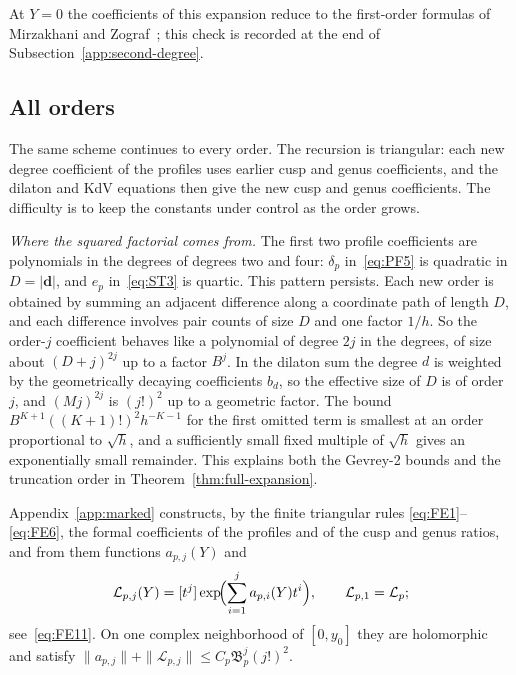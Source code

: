 At $Y=0$ the coefficients of this expansion reduce to the first-order
formulas of Mirzakhani and Zograf~\cite[Theorems~1.4 and~3.2(i)]{MZ};
this check is recorded at the end of Subsection~\ref{app:second-degree}.

\subsection{All orders}\label{subsec:all-orders}
The same scheme continues to every order. The recursion is triangular:
each new degree coefficient of the profiles uses earlier cusp and genus
coefficients, and the dilaton and KdV equations then give the new cusp and
genus coefficients. The difficulty is to keep the constants under control
as the order grows.

\emph{Where the squared factorial comes from.} The first two profile coefficients are polynomials in the degrees of degrees two and four: $\delta_p$ in~\eqref{eq:PF5} is quadratic in $D=|\mathbf d|$, and $e_p$ in~\eqref{eq:ST3} is quartic. This pattern persists. Each new order is obtained by summing an adjacent difference along a coordinate path of length $D$, and each difference involves pair counts of size $D$ and one factor $1/h$. So the order-$j$ coefficient behaves like a polynomial of degree $2j$ in the degrees, of size about $(D+j)^{2j}$ up to a factor $B^j$. In the dilaton sum the degree $d$ is weighted by the geometrically decaying coefficients $b_d$, so the effective size of $D$ is of order $j$, and $(Mj)^{2j}$ is $(j!)^2$ up to a geometric factor. The bound $B^{K+1}((K+1)!)^2h^{-K-1}$ for the first omitted term is smallest at an order proportional to $\sqrt h$, and a sufficiently small fixed multiple of $\sqrt h$ gives an exponentially small remainder. This explains both the Gevrey-2 bounds and the truncation order in Theorem~\ref{thm:full-expansion}.

Appendix~\ref{app:marked} constructs, by the finite triangular rules
\eqref{eq:FE1}--\eqref{eq:FE6}, the formal coefficients of the profiles
and of the cusp and genus ratios, and from them functions $a_{p,j}(Y)$ and
\[
 \mathcal L_{p,j}(Y)=[t^j]\exp\!\Bigl(\sum_{i=1}^j a_{p,i}(Y)t^i\Bigr),
 \qquad \mathcal L_{p,1}=\mathcal L_p;
\]
see~\eqref{eq:FE11}. On one complex neighborhood of $[0,y_0]$ they are
holomorphic and satisfy
$\|a_{p,j}\|+\|\mathcal L_{p,j}\|\le C_p\mathfrak B_p^j(j!)^2$.

